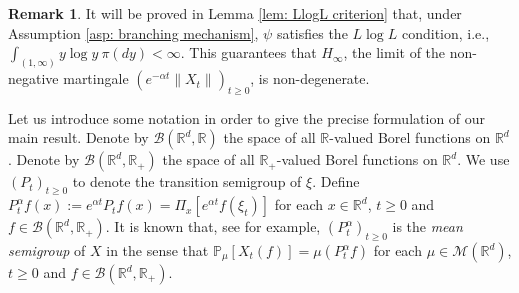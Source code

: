 \documentclass[12pt,a4paper]{amsart}
\theoremstyle{plain}
\theoremstyle{definition}
\newtheorem{rem}[thm]{Remark}
\numberwithin{equation}{section}
\begin{document}
\begin{rem}
It will be proved in Lemma \ref{lem: LlogL criterion} that, under Assumption \ref{asp: branching mechanism},
 $\psi$ satisfies the $L \log L$ condition, i.e., $ \int_{(1,\infty)} y\log y~\pi(dy) < \infty. $
This guarantees that $H_\infty$, the limit of the non-negative martingale $(e^{-\alpha t} \|X_t\|)_{t\geq 0}$, is non-degenerate.
\end{rem}
Let us introduce some notation in order to give the precise formulation of our main result.
Denote by $\mathcal B(\mathbb R^d, \mathbb R)$ the space of all $\mathbb R$-valued Borel functions on $\mathbb R^d$.
Denote by $\mathcal B(\mathbb R^d, \mathbb R_+)$ the space of all $\mathbb R_+$-valued Borel functions on $\mathbb R^d$.
We use  $(P_t)_{t\geq 0}$ to denote the transition semigroup of $\xi$.	
Define
\(
P^{\alpha}_t f(x)
  := e^{\alpha t} P_t f(x)
  = \Pi_x [e^{\alpha t}f(\xi_t)]
\)
for each $x\in \mathbb R^d$, $t\geq 0$ and $f\in \mathcal B(\mathbb R^d, \mathbb R_+)$.
It is known that, see \cite[Proposition 2.27]{Li2011Measure-valued} for example, $(P^\alpha_t)_{t\geq 0}$ is the \emph{mean semigroup} of $X$ in the sense that
\(
  \mathbb{P}_{\mu}[X_t (f)]  = \mu( P^\alpha_t f)
\)
for each $\mu\in \mathcal M(\mathbb R^d)$, $t\geq 0$ and $f\in \mathcal B(\mathbb R^d, \mathbb R_+)$.
\end{document}
